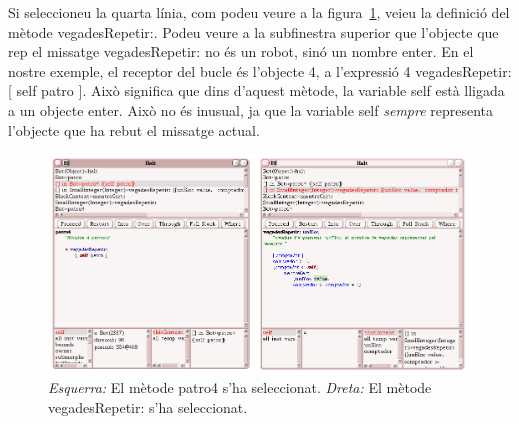 Si seleccioneu la quarta línia, com podeu veure a la figura~\ref{fig1505}, veieu la definició del mètode \textsf{vegadesRepetir:}. Podeu veure a la subfinestra superior que l'objecte que rep el missatge \textsf{vegadesRepetir:} no  és un robot, sinó un nombre enter. En el nostre exemple, el receptor del bucle és l'objecte \textsf{4}, a l'expressió \textsf{4 vegadesRepetir: [ self patro ]}. Això significa que dins d'aquest mètode, la variable \textsf{self} està lligada a un objecte enter. Això no és inusual, ja que la variable \textsf{self} \emph{sempre} representa l'objecte que ha rebut el missatge actual.  
\begin{figure}[h]
\begin{center}
\includegraphics[scale=0.4]{Imatges/figura15-5.png}
\end{center}
\caption{\emph{Esquerra:} El mètode \textsf{\upshape patro4} s'ha seleccionat.
\emph{Dreta:} El mètode \textsf{\upshape vegadesRepetir:} s'ha seleccionat.}
\label{fig1505}
\end{figure}

